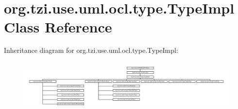 \hypertarget{classorg_1_1tzi_1_1use_1_1uml_1_1ocl_1_1type_1_1_type_impl}{\section{org.\-tzi.\-use.\-uml.\-ocl.\-type.\-Type\-Impl Class Reference}
\label{classorg_1_1tzi_1_1use_1_1uml_1_1ocl_1_1type_1_1_type_impl}
}
Inheritance diagram for org.\-tzi.\-use.\-uml.\-ocl.\-type.\-Type\-Impl\-:\begin{figure}[H]
\begin{center}
\leavevmode
\includegraphics[height=2.627737cm]{classorg_1_1tzi_1_1use_1_1uml_1_1ocl_1_1type_1_1_type_impl}
\end{center}
\end{figure}
